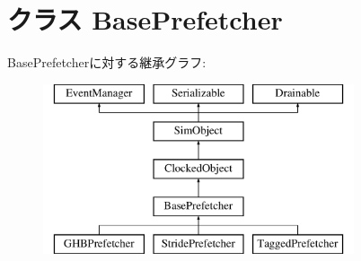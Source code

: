 \hypertarget{classPrefetcher_1_1BasePrefetcher}{
\section{クラス BasePrefetcher}
\label{classPrefetcher_1_1BasePrefetcher}
}
BasePrefetcherに対する継承グラフ:\begin{figure}[H]
\begin{center}
\leavevmode
\includegraphics[height=5cm]{classPrefetcher_1_1BasePrefetcher}
\end{center}
\end{figure}
